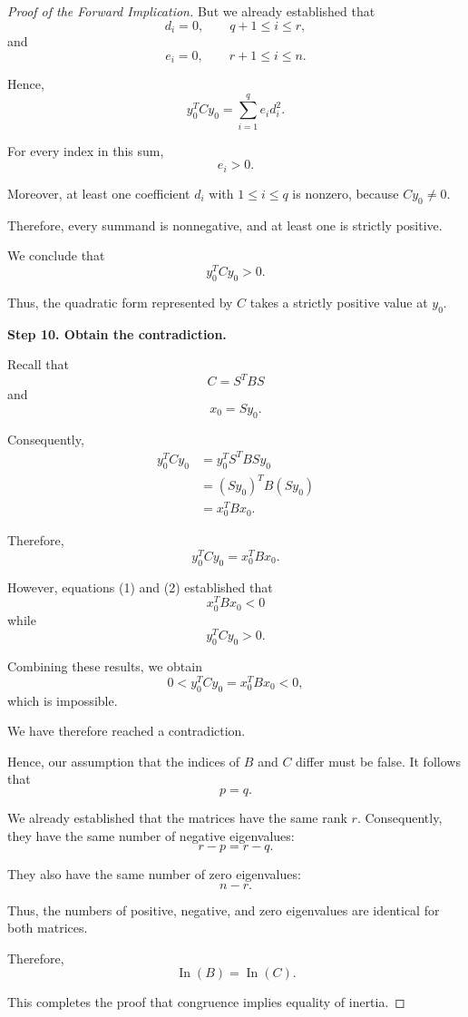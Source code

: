 \documentclass[11pt]{article}
\theoremstyle{definition}
\theoremstyle{remark}
\begin{document}
\begin{proof}[Proof of the Forward Implication]
But we already established that
\[
    d_i=0,\qquad q+1\leq i\leq r,
\]
and
\[
    e_i=0,\qquad r+1\leq i\leq n.
\]

Hence,
\[
    \boxed{
    y_0^TCy_0
    =\sum_{i=1}^{q}e_id_i^2.
    }
\]

For every index in this sum,
\[
    e_i>0.
\]

Moreover, at least one coefficient
$d_i$ with $1\leq i\leq q$ is
nonzero, because $Cy_0\neq 0$.

Therefore, every summand is
nonnegative, and at least one
is strictly positive.

We conclude that
\[
    \boxed{y_0^TCy_0>0}.
    \tag{2}
\]

Thus, the quadratic form represented
by $C$ takes a strictly positive
value at $y_0$.

\medskip

\textbf{Step 10. Obtain the contradiction.}

Recall that
\[
    C=S^TBS
\]
and
\[
    x_0=Sy_0.
\]

Consequently,
\[
\begin{aligned}
    y_0^TCy_0
    &=y_0^TS^TBSy_0\\
    &=(Sy_0)^TB(Sy_0)\\
    &=x_0^TBx_0.
\end{aligned}
\]

Therefore,
\[
    \boxed{y_0^TCy_0=x_0^TBx_0}.
\]

However, equations (1) and (2)
established that
\[
    x_0^TBx_0<0
\]
while
\[
    y_0^TCy_0>0.
\]

Combining these results,
we obtain
\[
    0<y_0^TCy_0=x_0^TBx_0<0,
\]
which is impossible.

We have therefore reached a contradiction.

Hence, our assumption that the indices
of $B$ and $C$ differ must be false.
It follows that
\[
    \boxed{p=q}.
\]

We already established that the
matrices have the same rank $r$.
Consequently, they have the same
number of negative eigenvalues:
\[
    r-p=r-q.
\]

They also have the same number
of zero eigenvalues:
\[
    n-r.
\]

Thus, the numbers of positive,
negative, and zero eigenvalues
are identical for both matrices.

Therefore,
\[
    \boxed{
    \operatorname{In}(B)=\operatorname{In}(C).
    }
\]

This completes the proof that
congruence implies equality of inertia.

\end{proof}
\end{document}
